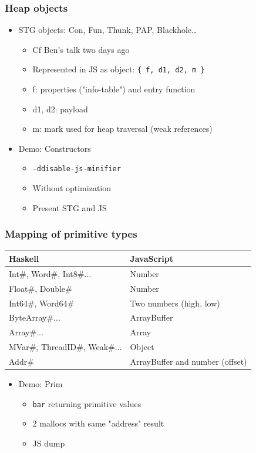 \documentclass{beamer}
\begin{document}
\begin{frame}
\frametitle{Heap objects}
  \begin{itemize}
    \item STG objects: Con, Fun, Thunk, PAP, Blackhole…
      \begin{itemize}
        \item Cf Ben's talk two days ago
        \item Represented in JS as object: \texttt{\{ f, d1, d2, m \}}
        \item f: properties ("info-table") and entry
          function
        \item d1, d2: payload
        \item m: mark used for heap traversal (weak references)
      \end{itemize}
    \item Demo: Constructors
      \begin{itemize}
        \item \texttt{-ddisable-js-minifier}
        \item Without optimization
        \item Present STG and JS
      \end{itemize}
  \end{itemize}
\end{frame}


\begin{frame}
  \frametitle{Mapping of primitive types}
  \begin{tabular}{ll}
    \hline
    Haskell & JavaScript \\ \hline
    Int\#, Word\#, Int8\#... & Number \\
    Float\#, Double\#        & Number\\
    Int64\#, Word64\#        & Two numbers (high, low) \\
    ByteArray\#...           & ArrayBuffer\\
    Array\#...               & Array\\
    MVar\#, ThreadID\#, Weak\#... & Object\\
    Addr\#                   & \alert{ArrayBuffer and number (offset)}\\
  \end{tabular}
  \hspace{1cm}
  \begin{itemize}
    \item Demo: Prim
      \begin{itemize}
        \item \texttt{bar} returning primitive values
        \item 2 mallocs with same "address" result
        \item JS dump
      \end{itemize}
  \end{itemize}
\end{frame}
\end{document}
